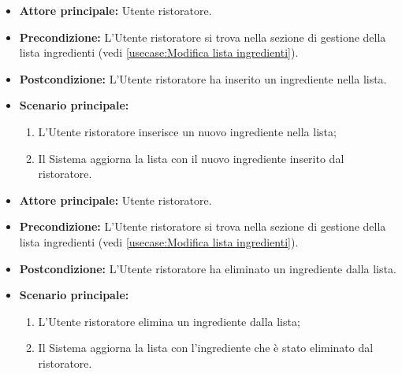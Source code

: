 \label{usecase:Inserimento ingrediente}
\begin{itemize}

	\item \textbf{Attore principale:} Utente ristoratore.

	\item \textbf{Precondizione:} L'Utente ristoratore si trova nella sezione di gestione della lista ingredienti (vedi \autoref{usecase:Modifica lista ingredienti}).

	\item \textbf{Postcondizione:} L'Utente ristoratore ha inserito un ingrediente nella lista.

	\item \textbf{Scenario principale:}
	\begin{enumerate}
		\item L'Utente ristoratore inserisce un nuovo ingrediente nella lista;
		\item Il Sistema aggiorna la lista con il nuovo ingrediente inserito dal ristoratore.
	\end{enumerate}

\end{itemize}

\label{usecase:Eliminazione ingrediente}
\begin{itemize}

	\item \textbf{Attore principale:} Utente ristoratore.

	\item \textbf{Precondizione:} L'Utente ristoratore si trova nella sezione di gestione della lista ingredienti (vedi \autoref{usecase:Modifica lista ingredienti}).

	\item \textbf{Postcondizione:} L'Utente ristoratore ha eliminato un ingrediente dalla lista.

	\item \textbf{Scenario principale:}
	\begin{enumerate}
		\item L'Utente ristoratore elimina un ingrediente dalla lista;
		\item Il Sistema aggiorna la lista con l'ingrediente che è stato eliminato dal ristoratore.
	\end{enumerate}

\end{itemize}

